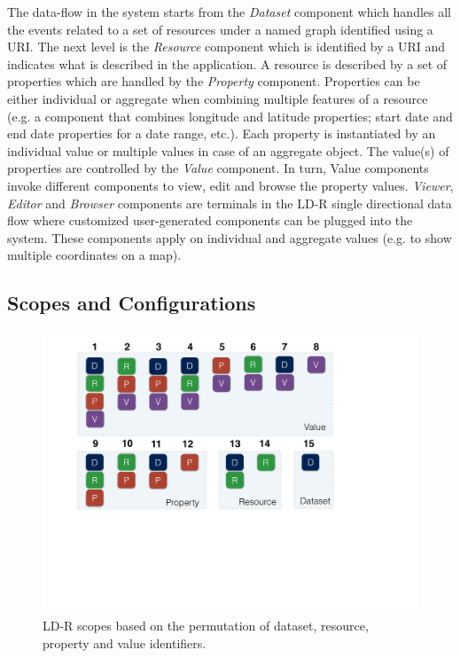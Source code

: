 \documentclass{acm_proc_article-sp}
\begin{document}
The data-flow in the system starts from the \emph{Dataset} component which handles all the events related to a set of resources under a named graph identified using a URI.
The next level is the \emph{Resource} component which is identified by a URI and indicates what is described in the application.
A resource is described by a set of properties which are handled by the \emph{Property} component. 
Properties can be either individual or aggregate when combining multiple features of a resource (e.g. a component that combines longitude and latitude properties; start date and end date properties for a date range, etc.).
Each property is instantiated by an individual value or multiple values in case of an aggregate object. 
The value(s) of properties are controlled by the \emph{Value} component.
In turn, Value components invoke different components to view, edit and browse the property values.
\emph{Viewer}, \emph{Editor} and \emph{Browser} components are terminals in the LD-R single directional data flow where customized user-generated components can be plugged into the system.
These components apply on individual and aggregate values (e.g. to show multiple coordinates on a map).

\subsection{Scopes and Configurations}

\begin{figure}[tb]
  \includegraphics[width=.95\linewidth]{images/scopes.pdf}
  \caption{LD-R scopes based on the permutation of dataset, resource, property and value identifiers.}
  \label{fig:scopes}
\end{figure}
\end{document}
